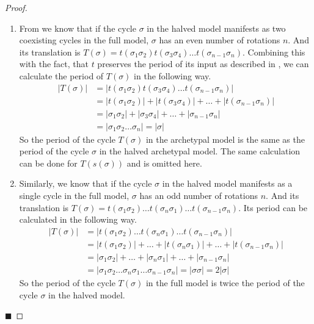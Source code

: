 \clearpage

\begin{proof} \phantom{x}
	\begin{enumerate}
		\item From  we know that if the cycle $\sigma$ in the halved model manifests as two coexisting cycles in the full model, $\sigma$ has an even number of rotations $n$.
		      And its translation is $T(\sigma) = t(\sigma_1\sigma_2) t(\sigma_3\sigma_4) \dots t(\sigma_{n-1}\sigma_n)$.
		      Combining this with the fact, that $t$ preserves the period of its input as described in , we can calculate the period of $T(\sigma)$ in the following way.
		      \begin{align*}
			      |T(\sigma)| & = |t(\sigma_1\sigma_2) t(\sigma_3\sigma_4) \dots t(\sigma_{n-1}\sigma_n)|           \\
			                  & = |t(\sigma_1\sigma_2)| + |t(\sigma_3\sigma_4)| + \dots + |t(\sigma_{n-1}\sigma_n)| \\
			                  & = |\sigma_1\sigma_2| + |\sigma_3\sigma_4| + \dots + |\sigma_{n-1}\sigma_n|          \\
			                  & = |\sigma_1\sigma_2 \dots \sigma_n| = |\sigma|
		      \end{align*}
		      So the period of the cycle $T(\sigma)$ in the archetypal model is the same as the period of the cycle $\sigma$ in the halved archetypal model.
		      The same calculation can be done for $T(s(\sigma))$ and is omitted here.
		\item Similarly, we know that if the cycle $\sigma$ in the halved model manifests as a single cycle in the full model, $\sigma$ has an odd number of rotations $n$.
		      And its translation is $T(\sigma) = t(\sigma_1\sigma_2) \dots t(\sigma_n\sigma_1) \dots t(\sigma_{n-1}\sigma_n)$.
		      Its period can be calculated in the following way.
		      \begin{align*}
			      |T(\sigma)| & = |t(\sigma_1\sigma_2) \dots t(\sigma_n\sigma_1) \dots t(\sigma_{n-1}\sigma_n)|                      \\
			                  & = |t(\sigma_1\sigma_2)| + \dots + |t(\sigma_n\sigma_1)| + \dots + |t(\sigma_{n-1}\sigma_n)|          \\
			                  & = |\sigma_1\sigma_2| + \dots + |\sigma_n\sigma_1| + \dots + |\sigma_{n-1}\sigma_n|                   \\
			                  & = |\sigma_1\sigma_2 \dots \sigma_n\sigma_1 \dots \sigma_{n-1}\sigma_n| = |\sigma\sigma| = 2 |\sigma|
		      \end{align*}
		      So the period of the cycle $T(\sigma)$ in the full model is twice the period of the cycle $\sigma$ in the halved model.
	\end{enumerate}
	\hfill $\blacksquare$
\end{proof}

